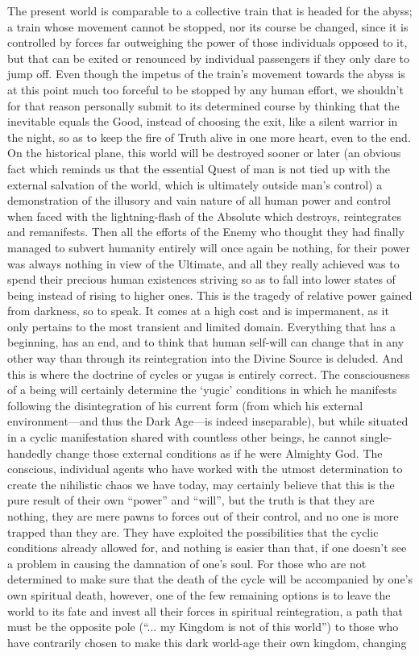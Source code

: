 \begin{footnotesize}
\begin{sffamily}
The present world is comparable to a collective train that is headed for the abyss; a train whose movement cannot be stopped, nor its course be changed, since it is controlled by forces far outweighing the power of those individuals opposed to it, but that can be exited or renounced by individual passengers if they only dare to jump off. Even though the impetus of the train's movement towards the abyss is at this point much too forceful to be stopped by any human effort, we shouldn't for that reason personally submit to its determined course by thinking that the inevitable equals the Good, instead of choosing the exit, like a silent warrior in the night, so as to keep the fire of Truth alive in one more heart, even to the end. On the historical plane, this world will be destroyed sooner or later (an obvious fact which reminds us that the essential Quest of man is not tied up with the external salvation of the world, which is ultimately outside man's control) a demonstration of the illusory and vain nature of all human power and control when faced with the lightning-flash of the Absolute which destroys, reintegrates and remanifests. Then all the efforts of the Enemy who thought they had finally managed to subvert humanity entirely will once again be nothing, for their power was always nothing in view of the Ultimate, and all they really achieved was to spend their precious human existences striving so as to fall into lower states of being instead of rising to higher ones. This is the tragedy of relative power gained from darkness, so to speak. It comes at a high cost and is impermanent, as it only pertains to the most transient and limited domain. Everything that has a beginning, has an end, and to think that human self-will can change that in any other way than through its reintegration into the Divine Source is deluded. And this is where the doctrine of cycles or yugas is entirely correct. The consciousness of a being will certainly determine the `yugic' conditions in which he manifests following the disintegration of his current form (from which his external environment---and thus the Dark Age---is indeed inseparable), but while situated in a cyclic manifestation shared with countless other beings, he cannot single-handedly change those external conditions as if he were Almighty God. The conscious, individual agents who have worked with the utmost determination to create the nihilistic chaos we have today, may certainly believe that this is the pure result of their own ``power'' and ``will'', but the truth is that they are nothing, they are mere pawns to forces out of their control, and no one is more trapped than they are. They have exploited the possibilities that the cyclic conditions already allowed for, and nothing is easier than that, if one doesn't see a problem in causing the damnation of one's soul. For those who are not determined to make sure that the death of the cycle will be accompanied by one's own spiritual death, however, one of the few remaining options is to leave the world to its fate and invest all their forces in spiritual reintegration, a path that must be the opposite pole (``... my Kingdom is not of this world'') to those who have contrarily chosen to make this dark world-age their own kingdom, changing 
\end{sffamily}
\end{footnotesize}
